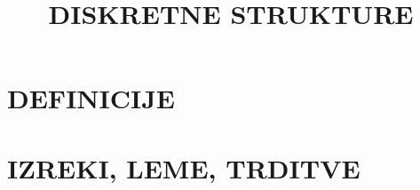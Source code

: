 \documentclass{beamer}
\begin{document}
\title{DISKRETNE STRUKTURE}
\date{}
\titlepage

\section{DEFINICIJE}
\begin{frame}
\sectionpage
\end{frame}




\section{IZREKI, LEME, TRDITVE}
\begin{frame}
    \sectionpage
\end{frame}


\end{document}

